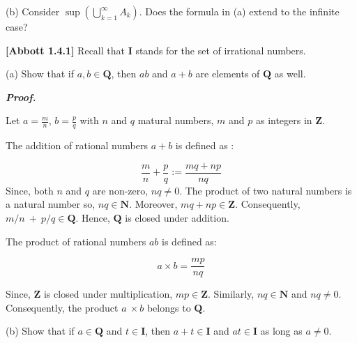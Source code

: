 \documentclass[10pt]{article}
\begin{document}
(b) Consider $\displaystyle \sup \left(\bigcup _{k=1}^{\infty } A_{k}\right)$. Does the formula in (a) extend to the infinite case? 



\textbf{[Abbott 1.4.1]} Recall that \textbf{I} stands for the set of irrational numbers.



(a) Show that if $\displaystyle a,b\in \mathbf{Q}$, then $\displaystyle ab$ and $\displaystyle a+b$ are elements of $\displaystyle \mathbf{Q}$ as well.



\textbf{\textit{Proof.}}



Let $\displaystyle a=\frac{m}{n}$, $\displaystyle b=\frac{p}{q}$ with $\displaystyle n$ and $\displaystyle q$ matural numbers, $\displaystyle m$ and $\displaystyle p$ as integers in $\displaystyle \mathbf{Z}$. 



The addition of rational numbers $\displaystyle a+b$ is defined as :


\begin{equation*}
\frac{m}{n} +\frac{p}{q} :=\frac{mq+np}{nq}
\end{equation*}
Since, both $\displaystyle n$ and $\displaystyle q$ are non-zero, $\displaystyle nq\neq 0$. The product of two natural numbers is a natural number so, $\displaystyle nq\in \mathbf{N}$. Moreover, $\displaystyle mq+np\in \mathbf{Z}$. Consequently, $\displaystyle m/n\ +\ p/q\in \mathbf{Q}$. Hence, $\displaystyle \mathbf{Q}$ is closed under addition.



 The product of rational numbers $\displaystyle ab$ is defined as:


\begin{equation*}
a\times b=\frac{mp}{nq}
\end{equation*}


Since, $\displaystyle \mathbf{Z}$ is closed under multiplication, $\displaystyle mp\in \mathbf{Z}$. Similarly, $\displaystyle nq\in \mathbf{N}$ and $\displaystyle nq\neq 0$. Consequently, the product $\displaystyle a\ \times b$ belongs to $\displaystyle \mathbf{Q}$.



(b) Show that if $\displaystyle a\in \mathbf{Q}$ and $\displaystyle t\in \mathbf{I}$, then $\displaystyle a+t\in \mathbf{I}$ and $\displaystyle at\in \mathbf{I}$ as long as $\displaystyle a\neq 0$.
\end{document}
